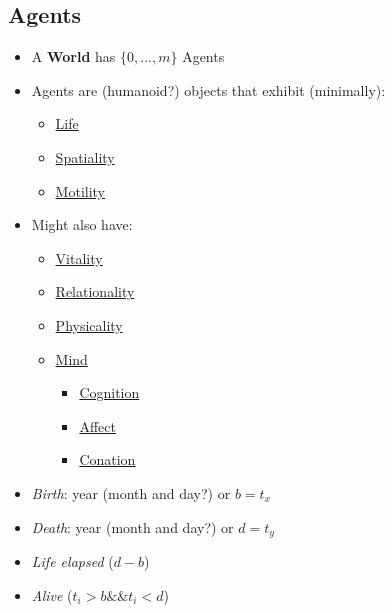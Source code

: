 \documentclass[]{article}
\begin{document}
\subsection{Agents}\label{agents}

\begin{itemize}
\itemsep1pt\parskip0pt
\item
  A \textbf{World} has \(\{0,...,m\}\) Agents
\item
  Agents are (humanoid?) objects that exhibit (minimally):

  \begin{itemize}
  \itemsep1pt\parskip0pt
  \item
    \hyperref[life]{Life}
  \item
    \hyperref[spatiality]{Spatiality}
  \item
    \hyperref[motility]{Motility}
  \end{itemize}
\item
  Might also have:

  \begin{itemize}
  \itemsep1pt\parskip0pt
  \item
    \hyperref[vitality]{Vitality}
  \item
    \hyperref[relationality]{Relationality}
  \item
    \hyperref[physicality]{Physicality}
  \item
    \hyperref[mind]{Mind}

    \begin{itemize}
    \itemsep1pt\parskip0pt
    \item
      \hyperref[cognition]{Cognition}
    \item
      \hyperref[affect]{Affect}
    \item
      \hyperref[conation]{Conation}
    \end{itemize}
  \end{itemize}
\end{itemize}


\begin{itemize}
\itemsep1pt\parskip0pt
\item
  \emph{Birth}: year (month and day?) or \(b = t_x\)
\item
  \emph{Death}: year (month and day?) or \(d = t_y\)
\item
  \emph{Life elapsed} (\(d - b\))
\item
  \emph{Alive} (\(t_i > b \&\& t_i < d\))
\end{itemize}
\end{document}
